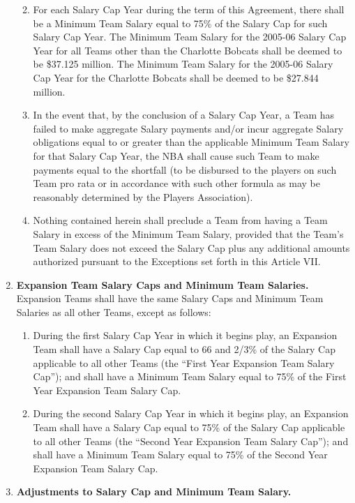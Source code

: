 \documentclass[
]{book}
\providecommand{\tightlist}{%
  \setlength{\itemsep}{0pt}\setlength{\parskip}{0pt}}
\begin{document}
\begin{enumerate}
  \begin{enumerate}
  \def\labelenumii{(\arabic{enumii})}
  \tightlist
  \item
    For each Salary Cap Year during the term of this Agreement, there shall be a Minimum Team Salary equal to 75\% of the Salary Cap for such Salary Cap Year. The Minimum Team Salary for the 2005-06 Salary Cap Year for all Teams other than the Charlotte Bobcats shall be deemed to be \$37.125 million. The Minimum Team Salary for the 2005-06 Salary Cap Year for the Charlotte Bobcats shall be deemed to be \$27.844 million.
  \item
    In the event that, by the conclusion of a Salary Cap Year, a Team has failed to make aggregate Salary payments and/or incur aggregate Salary obligations equal to or greater than the applicable Minimum Team Salary for that Salary Cap Year, the NBA shall cause such Team to make payments equal to the shortfall (to be disbursed to the players on such Team pro rata or in accordance with such other formula as may be reasonably determined by the Players Association).
  \item
    Nothing contained herein shall preclude a Team from having a Team Salary in excess of the Minimum Team Salary, provided that the Team's Team Salary does not exceed the Salary Cap plus any additional amounts authorized pursuant to the Exceptions set forth in this Article VII.
  \end{enumerate}
\item
  \textbf{Expansion Team Salary Caps and Minimum Team Salaries.} Expansion Teams shall have the same Salary Caps and Minimum Team Salaries as all other Teams, except as follows:

  \begin{enumerate}
  \def\labelenumii{(\arabic{enumii})}
  \tightlist
  \item
    During the first Salary Cap Year in which it begins play, an Expansion Team shall have a Salary Cap equal to 66 and 2/3\% of the Salary Cap applicable to all other Teams (the ``First Year Expansion Team Salary Cap''); and shall have a Minimum Team Salary equal to 75\% of the First Year Expansion Team Salary Cap.
  \item
    During the second Salary Cap Year in which it begins play, an Expansion Team shall have a Salary Cap equal to 75\% of the Salary Cap applicable to all other Teams (the ``Second Year Expansion Team Salary Cap''); and shall have a Minimum Team Salary equal to 75\% of the Second Year Expansion Team Salary Cap.
  \end{enumerate}
\item
  \textbf{Adjustments to Salary Cap and Minimum Team Salary.}


\end{enumerate}
\end{document}
